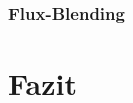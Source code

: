 \documentclass[bigchapter,twoside,report,11pt,type=bsc,colorback,accentcolor=tud2c]{tudthesis}
\begin{document}
\subsection{Flux-Blending}

\chapter{Fazit}


\appendix





%
%

  \cleardoublepage




\nocite{*}
\end{document}
